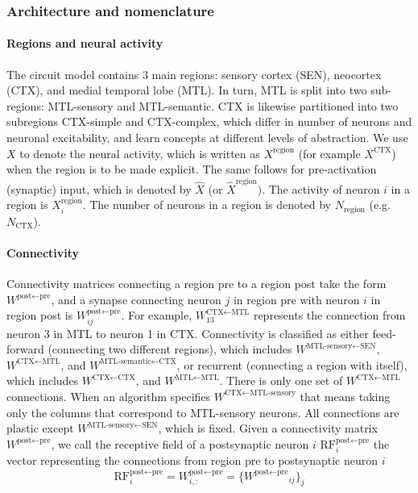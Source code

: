 \documentclass{article}
\begin{document}
\subsubsection*{Architecture and nomenclature}
\paragraph*{Regions and neural activity}
The circuit model contains 3 main regions: sensory cortex (SEN), neocortex (CTX), and medial temporal lobe (MTL). In turn, MTL is split into two sub-regions: MTL-sensory and MTL-semantic. CTX is likewise partitioned into two subregions CTX-simple and CTX-complex, which differ in number of neurons and neuronal excitability, and learn concepts at different levels of abstraction. We use $X$ to denote the neural activity, which is written as $X^\textrm{region}$ (for example $X^\textrm{CTX}$) when the region is to be made explicit. The same follows for pre-activation (synaptic) input, which is denoted by $\hat{X}$ (or $\hat{X}^\textrm{region})$. The activity of neuron $i$ in a region is $X^\textrm{region}_i$. The number of neurons in a region is denoted by $N_\textrm{region}$ (e.g. $N_\textrm{CTX}$).
\paragraph{Connectivity}
Connectivity matrices connecting a region \textrm{pre} to a region \textrm{post} take the form $W^{\textrm{post}\leftarrow\textrm{pre}}$, and a synapse connecting neuron $j$ in region pre with neuron $i$ in region post is $W^{\textrm{post}\leftarrow\textrm{pre}}_{ij}$. For example, $W^{\textrm{CTX}\leftarrow\textrm{MTL}}_{13}$ represents the connection from neuron 3 in MTL to neuron 1 in CTX. Connectivity is classified as either feed-forward (connecting two different regions), which includes  $W^{\textrm{MTL-sensory}\leftarrow\textrm{SEN}}$, $W^{\textrm{CTX}\leftarrow\textrm{MTL}}$, and $W^{\textrm{MTL-semantic}\leftarrow\textrm{CTX}}$, or recurrent (connecting a region with itself), which includes $W^{\textrm{CTX}\leftarrow\textrm{CTX}}$, and $W^{\textrm{MTL}\leftarrow\textrm{MTL}}$. There is only one set of $W^{\textrm{CTX}\leftarrow\textrm{MTL}}$ connections. When an algorithm specifies $W^{\textrm{CTX}\leftarrow\textrm{MTL-sensory}}$ that means taking only the columns that correspond to MTL-sensory neurons. All connections are plastic except $W^{\textrm{MTL-sensory}\leftarrow\textrm{SEN}}$, which is fixed. Given a connectivity matrix $W^{\textrm{post}\leftarrow\textrm{pre}}$, we call the receptive field of a postsynaptic neuron $i$ $\textrm{RF}^{\textrm{post}\leftarrow\textrm{pre}}_i$ the vector representing the connections from region pre to postsynaptic neuron $i$
\begin{equation}
    \textrm{RF}^{\textrm{post}\leftarrow\textrm{pre}}_i =  W^{\textrm{post}\leftarrow\textrm{pre}}_{i,:} = \{{W^{\textrm{post}\leftarrow\textrm{pre}}}_{ij}\}_j 
\end{equation}
\end{document}
